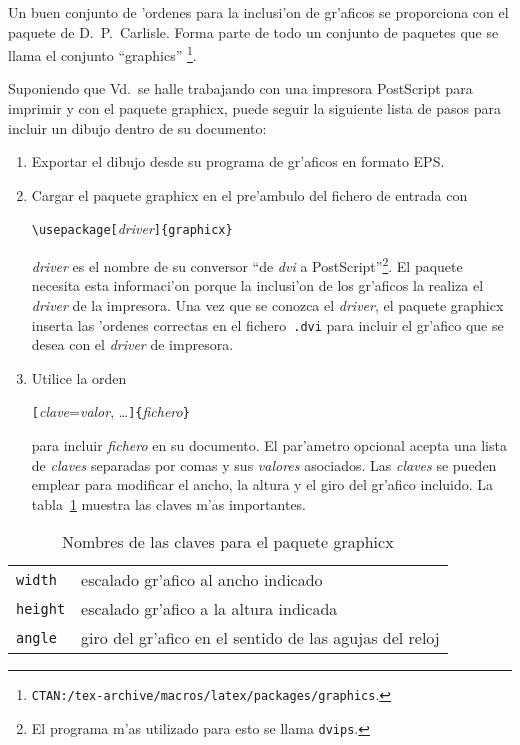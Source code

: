Un buen conjunto de 'ordenes para la inclusi'on de gr'aficos se
proporciona con el paquete  de D.~P.~Carlisle. Forma
parte de todo un conjunto de paquetes que se llama el conjunto
``graphics''%
\footnote{\texttt{CTAN:/tex-archive/macros/latex/packages/graphics}.}.

Suponiendo que Vd.\ se halle trabajando con una impresora PostScript
para imprimir y con el paquete \textsf{graphicx}, puede seguir la
siguiente lista de pasos para incluir un dibujo dentro de su documento:

\begin{enumerate}
\item Exportar el dibujo desde su programa de gr'aficos en formato EPS.
\item Cargar el paquete \textsf{graphicx} en el pre'ambulo del fichero
  de entrada con
\begin{command}
\verb|\usepackage[|\emph{driver}\verb|]{graphicx}|
\end{command}
\emph{driver} es el nombre de su conversor ``de \emph{dvi} a
PostScript''\footnote{El programa m'as utilizado para esto se llama
  \texttt{dvips}.}. El paquete necesita esta informaci'on porque la
inclusi'on de los gr'aficos la realiza el \emph{driver} de la
impresora. Una vez que se conozca el \emph{driver}, el paquete
\textsf{graphicx} inserta las 'ordenes correctas en el
fichero~\texttt{.dvi} para incluir el gr'afico que se desea con el
\emph{driver} de impresora.
 
\item Utilice la orden
\begin{command}
\verb|[|\emph{clave}=\emph{valor},
 \ldots\verb|]{|\emph{fichero}\verb|}|
\end{command}
para incluir \emph{fichero} en su documento. El par'ametro opcional
acepta una lista de \emph{claves} separadas por comas y sus \emph{valores}
asociados. Las \emph{claves} se pueden emplear para modificar el ancho,
la altura y el giro del gr'afico incluido. La tabla~\ref{keyvals}
muestra las claves m'as importantes.
\end{enumerate}

\begin{table}[htb]
\caption{Nombres de las claves para el paquete \textsf{graphicx}}
\label{keyvals}
\begin{lined}{10.1cm}
\begin{tabular}{@{}ll}
\texttt{width}& escalado gr'afico al ancho indicado\\
\texttt{height}& escalado gr'afico a la altura indicada\\
\texttt{angle}& giro del gr'afico en el sentido de las agujas del reloj
\end{tabular}

\bigskip
\end{lined}
\end{table}

